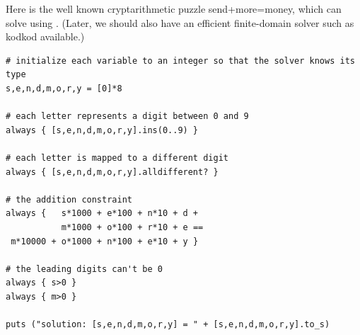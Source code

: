 Here is the well known cryptarithmetic puzzle send+more=money, which \toolname can solve
using \zthree.  (Later, we should also have an efficient finite-domain
solver such as kodkod available.)
\begin{lstlisting}
# initialize each variable to an integer so that the solver knows its type
s,e,n,d,m,o,r,y = [0]*8

# each letter represents a digit between 0 and 9
always { [s,e,n,d,m,o,r,y].ins(0..9) } 

# each letter is mapped to a different digit
always { [s,e,n,d,m,o,r,y].alldifferent? }

# the addition constraint
always {   s*1000 + e*100 + n*10 + d +
           m*1000 + o*100 + r*10 + e ==
 m*10000 + o*1000 + n*100 + e*10 + y }

# the leading digits can't be 0
always { s>0 }
always { m>0 }

puts ("solution: [s,e,n,d,m,o,r,y] = " + [s,e,n,d,m,o,r,y].to_s)
\end{lstlisting}


